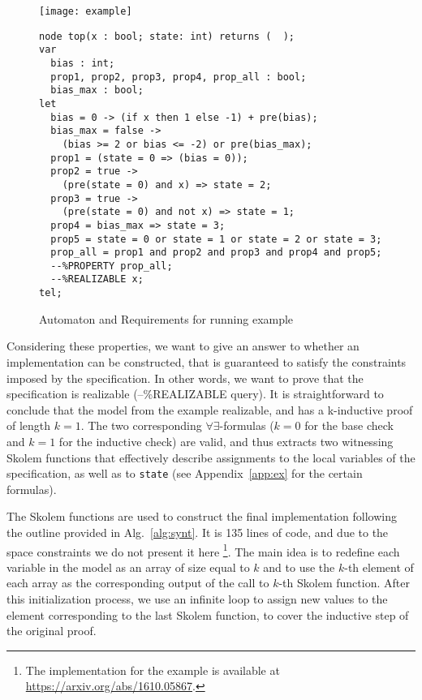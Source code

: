 \begin{figure}[tb]
\begin{minipage}[c]{0.35\textwidth}
\centering
\texttt{[image: example]}
\end{minipage}
\begin{minipage}[c]{0.7\textwidth}
 \begin{Verbatim}[fontsize=\scriptsize]
node top(x : bool; state: int) returns (  );
var
  bias : int;
  prop1, prop2, prop3, prop4, prop_all : bool;
  bias_max : bool;
let
  bias = 0 -> (if x then 1 else -1) + pre(bias);
  bias_max = false ->
	(bias >= 2 or bias <= -2) or pre(bias_max);
  prop1 = (state = 0 => (bias = 0));
  prop2 = true ->
  	(pre(state = 0) and x) => state = 2;
  prop3 = true ->
  	(pre(state = 0) and not x) => state = 1;
  prop4 = bias_max => state = 3;
  prop5 = state = 0 or state = 1 or state = 2 or state = 3;
  prop_all = prop1 and prop2 and prop3 and prop4 and prop5;
  --%PROPERTY prop_all;
  --%REALIZABLE x;
tel;
 \end{Verbatim}
\end{minipage}
\caption{Automaton and Requirements for running example}
\label{fg:example}
\end{figure}

Considering these properties, we want to give an answer to whether
an implementation can be constructed, that is guaranteed to satisfy the
constraints imposed by the specification. In other words, we want to prove
that the specification is realizable (--\%REALIZABLE query). It is
straightforward to conclude that the model from the example realizable, and has
a k-inductive proof of length $k = 1$. The two corresponding
$\forall\exists$-formulas ($k=0$ for the base check and $k=1$ for the inductive
check) are valid, and thus  \aeval extracts two witnessing Skolem functions
that effectively describe
 assignments to the local variables of the specification, as well as to \texttt{state}
(see Appendix~\ref{app:ex} for the certain formulas).

The Skolem functions are used to construct the final implementation
following the outline provided in Alg.~\ref{alg:synt}. 
It is 135 lines of code, and due to the space constraints we do not
present it here%
\footnote{The implementation for the
example is available at \url{https://arxiv.org/abs/1610.05867}.}.
The main idea is to redefine each variable in the model 
as an array of size equal to $k$ and
to use the $k$-th element of each array as the corresponding output of the call
to $k$-th Skolem function. After this initialization process, we use an infinite
loop to assign new values to the element corresponding to the last Skolem
function, to cover the inductive step of the original proof.
